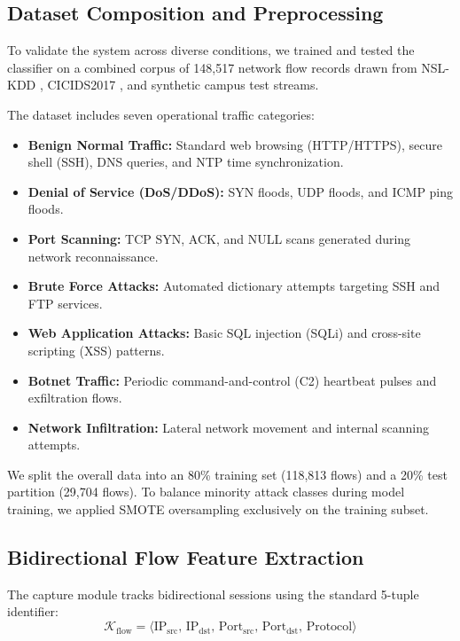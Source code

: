 \documentclass[conference]{IEEEtran}
\begin{document}
\subsection{Dataset Composition and Preprocessing}
To validate the system across diverse conditions, we trained and tested the classifier on a combined corpus of 148,517 network flow records drawn from NSL-KDD \cite{tavallaee2009}, CICIDS2017 \cite{sharafaldin2018}, and synthetic campus test streams.

The dataset includes seven operational traffic categories:
\begin{itemize}
    \item \textbf{Benign Normal Traffic:} Standard web browsing (HTTP/HTTPS), secure shell (SSH), DNS queries, and NTP time synchronization.
    \item \textbf{Denial of Service (DoS/DDoS):} SYN floods, UDP floods, and ICMP ping floods.
    \item \textbf{Port Scanning:} TCP SYN, ACK, and NULL scans generated during network reconnaissance.
    \item \textbf{Brute Force Attacks:} Automated dictionary attempts targeting SSH and FTP services.
    \item \textbf{Web Application Attacks:} Basic SQL injection (SQLi) and cross-site scripting (XSS) patterns.
    \item \textbf{Botnet Traffic:} Periodic command-and-control (C2) heartbeat pulses and exfiltration flows.
    \item \textbf{Network Infiltration:} Lateral network movement and internal scanning attempts.
\end{itemize}

We split the overall data into an 80\% training set (118,813 flows) and a 20\% test partition (29,704 flows). To balance minority attack classes during model training, we applied SMOTE oversampling exclusively on the training subset.

\subsection{Bidirectional Flow Feature Extraction}
The capture module tracks bidirectional sessions using the standard 5-tuple identifier:
\begin{equation}
\mathcal{K}_{\text{flow}} = \langle \text{IP}_{\text{src}},\, \text{IP}_{\text{dst}},\, \text{Port}_{\text{src}},\, \text{Port}_{\text{dst}},\, \text{Protocol} \rangle
\end{equation}
\end{document}
